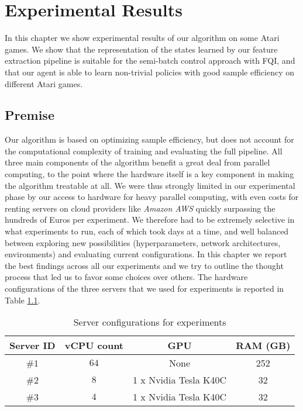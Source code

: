 \chapter{Experimental Results}
\label{chapter6_experiments}
\thispagestyle{empty}

\vspace{0.5cm}

In this chapter we show experimental results of our algorithm on some Atari
games.
We show that the representation of the states learned by our feature extraction 
pipeline is suitable for the semi-batch control approach with FQI, and that 
our agent is able to learn non-trivial policies with good sample efficiency on 
different Atari games.

\section{Premise}
Our algorithm is based on optimizing sample efficiency, but does not account for
the computational complexity of training and evaluating the full pipeline. 
All three main components of the algorithm benefit a great deal from parallel 
computing, to the point where the hardware itself is a key component in 
making the algorithm treatable at all. 
We were thus strongly limited in our experimental phase by our access to 
hardware for heavy parallel computing, with even costs for renting servers on 
cloud providers like \textit{Amazon AWS} quickly surpassing the hundreds of 
Euros per experiment. We therefore had to be extremely selective in what 
experiments to run, each of which took days at a time, and well balanced between
exploring new possibilities (hyperparameters, network architectures, 
environments) and evaluating current configurations. 
In this chapter we report the best findings across all our experiments and we 
try to outline the thought process that led us to favor some choices over others.
The hardware configurations of the three servers that we used for experiments is
reported in Table \ref{t:servers}. 
%
\begin{table}[h]
    \centering
    \begin{tabular}{c c c c} 
	\hline
	Server ID & vCPU count & GPU & RAM (GB) \\ 
	\hline 
	\#$1$ & $64$ & None & 252 \\
	\#$2$ & $8$ & 1 x Nvidia Tesla K40C & 32 \\
	\#$3$ & $4$ & 1 x Nvidia Tesla K40C & 32 \\
	\hline
    \end{tabular}
    \caption{Server configurations for experiments}
    \label{t:servers}
\end{table}
%

